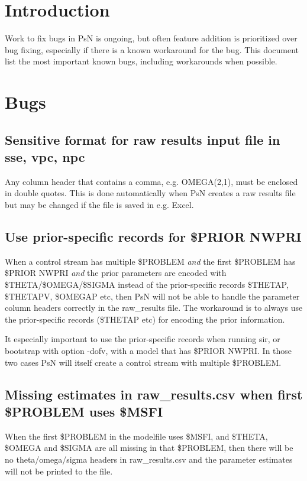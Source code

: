 




\maketitle


\section{Introduction}
Work to fix bugs in PsN is ongoing, but often feature addition is prioritized over bug fixing, especially if there is a known workaround for the bug. This document list the most important known bugs, including workarounds when possible.   

\section{Bugs}

\subsection{Sensitive format for raw results input file in sse, vpc, npc}
Any column header that contains a comma, e.g. OMEGA(2,1), must be enclosed in double quotes. This is done automatically when PsN creates a raw results file but may be changed if the file is saved in e.g. Excel.

\subsection{Use prior-specific records for \$PRIOR NWPRI}
When a control stream has multiple \$PROBLEM \emph{and} the first \$PROBLEM has \$PRIOR NWPRI
\emph{and} the prior parameters are encoded with \$THETA/\$OMEGA/\$SIGMA instead of the
prior-specific records \$THETAP, \$THETAPV, \$OMEGAP etc, then PsN will not be able to handle the parameter column
headers correctly in the raw\_results file. The workaround is to always use the prior-specific records 
(\$THETAP etc) for encoding the prior information.

It especially important to use the prior-specific records when running sir,  
or bootstrap with option -dofv,
with a model that has \$PRIOR NWPRI. In
those two cases PsN will itself create a control stream with multiple \$PROBLEM.

\subsection{Missing estimates in raw\_results.csv when first \$PROBLEM uses \$MSFI}
When the first \$PROBLEM in the modelfile uses \$MSFI, and \$THETA, \$OMEGA and \$SIGMA are all missing in that \$PROBLEM, then there will be no theta/omega/sigma headers in raw\_results.csv and the parameter estimates will not be printed to the file.

